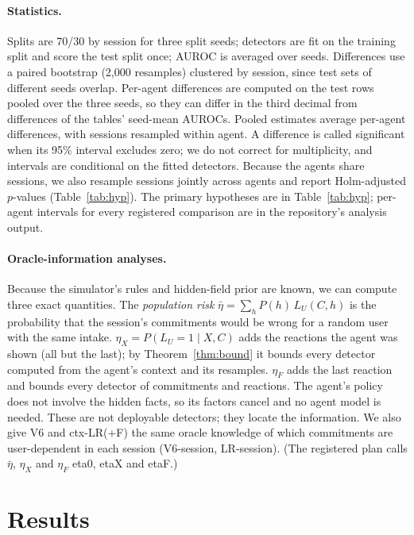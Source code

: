 \documentclass[10pt,a4paper,twocolumn]{article}
\newcommand{\LU}{L_{U}}
\begin{document}
\paragraph{Statistics.} Splits are 70/30 by session for three split seeds;
detectors are fit on the training split and score the test split once;
AUROC is averaged over seeds. Differences use a paired bootstrap (2,000
resamples) clustered by session, since test sets of different seeds
overlap. Per-agent differences are computed on the test rows pooled over the
three seeds, so they can differ in the third decimal from differences of the
tables' seed-mean AUROCs. Pooled estimates average per-agent differences,
with sessions resampled within agent. A difference is called significant when its 95\%
interval excludes zero; we do not correct for multiplicity, and intervals
are conditional on the fitted detectors. Because the agents share sessions,
we also resample sessions jointly across agents and report Holm-adjusted
$p$-values (Table~\ref{tab:hyp}). The primary
hypotheses are in Table~\ref{tab:hyp}; per-agent intervals for every
registered comparison are in the repository's analysis output.

\paragraph{Oracle-information analyses.} Because the simulator's rules and hidden-field prior are known, we can compute three exact quantities. The \emph{population risk} $\bar\eta=\sum_h P(h)\,\LU(C,h)$ is the probability that the session's commitments would be wrong for a random user with the same intake. $\eta_X=P(\LU=1\mid X,C)$ adds the reactions the agent was shown (all but the last); by Theorem~\ref{thm:bound} it bounds every detector computed from the agent's context and its resamples. $\eta_F$ adds the last reaction and bounds every detector of commitments and reactions. The agent's policy does not involve the hidden facts, so its factors cancel and no agent model is needed. These are not
deployable detectors; they locate the information. We also give V6 and
ctx-LR(+F) the same oracle knowledge of which commitments are
user-dependent in each session (V6-session, LR-session). (The registered
plan calls $\bar\eta$, $\eta_X$ and $\eta_F$ eta0, etaX and etaF.)

\section{Results}
\end{document}

